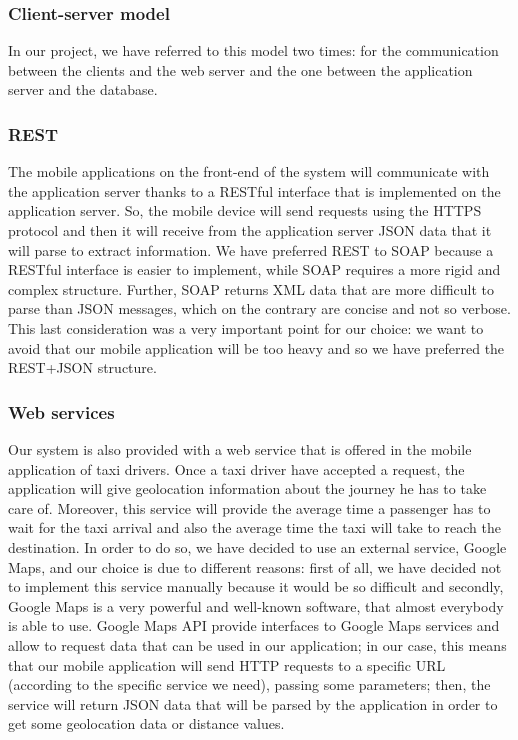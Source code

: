\subsubsection{Client-server model}

    In our project, we have referred to this model two times: for the communication between the clients and the web server and the one between the application server and the database.
    
\subsubsection{REST}
    
    The mobile applications on the front-end of the system will communicate with the application server thanks to a RESTful interface that is implemented on the application server. So, the mobile device will send requests using the HTTPS protocol and then it will receive from the application server JSON data that it will parse to extract information.
    \newline
    We have preferred REST to SOAP because a RESTful interface is easier to implement, while SOAP requires a more rigid and complex structure. Further, SOAP returns XML data that are more difficult to parse than JSON messages, which on the contrary are concise and not so verbose. This last consideration was a very important point for our choice: we want to avoid that our mobile application will be too heavy and so we have preferred the REST+JSON structure.
    
\subsubsection{Web services}
    
    Our system is also provided with a web service that is offered in the mobile application of taxi drivers. Once a taxi driver have accepted a request, the application will give geolocation information about the journey he has to take care of. Moreover, this service will provide the average time a passenger has to wait for the taxi arrival and also the average time the taxi will take to reach the destination.
    \newline
    In order to do so, we have decided to use an external service, Google Maps, and our choice is due to different reasons: first of all, we have decided not to implement this service manually because it would be so difficult and secondly, Google Maps is a very powerful and well-known software, that almost everybody is able to use.
    \newline
    Google Maps API provide interfaces to Google Maps services and allow to request data that can be used in our application; in our case, this means that our mobile application will send HTTP requests to a specific URL (according to the specific service we need), passing some parameters; then, the service will return JSON data that will be parsed by the application in order to get some geolocation data or distance values.